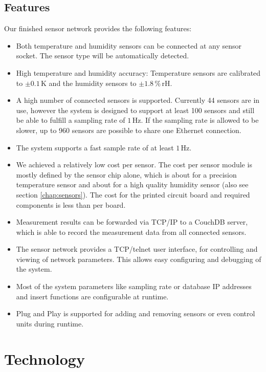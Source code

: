 \documentclass[a4paper]{scrreprt}
\begin{document}
\section{Features}
Our finished sensor network provides the following features:
\begin{itemize}
  \item Both temperature and humidity sensors can be connected at any
    sensor socket. The sensor type will be automatically detected.
  \item High temperature and humidity accuracy: Temperature sensors
    are calibrated to $\pm 0.1\,\mathrm{K}$ and the humidity
    sensors to $\pm 1.8\,\%\,\mathrm{rH}$.
  \item A high number of connected sensors is supported.
    Currently 44 sensors are in use, however the system is designed
    to support at least 100 sensors and still be able to fulfill a
    sampling rate of $1\,\mathrm{Hz}$. If the sampling rate is
    allowed to be slower, up to 960 sensors are possible to share
    one Ethernet connection.
  \item The system supports a fast sample rate of at least $1\,\mathrm{Hz}$.
  \item We achieved a relatively low cost per sensor. The cost per
    sensor module is mostly
    defined by the sensor chip alone, which is about  for a
    precision temperature sensor and about  for a high quality
    humidity sensor (also see section \ref{chap:sensors}). The cost for
    the printed circuit board and required components is less than
     per board.
  \item Measurement results can be forwarded via TCP/IP to a CouchDB
    server, which is able to record the measurement data from all
    connected sensors.
  \item The sensor network provides a TCP/telnet user interface, for
    controlling and viewing of network parameters. This allows easy configuring
    and debugging of the system.
  \item Most of the system parameters like sampling rate or database IP addresses
    and insert functions are configurable at runtime.
  \item Plug and Play is supported for adding and removing sensors or even
    control units during runtime.
\end{itemize}
\chapter{Technology}
\end{document}
